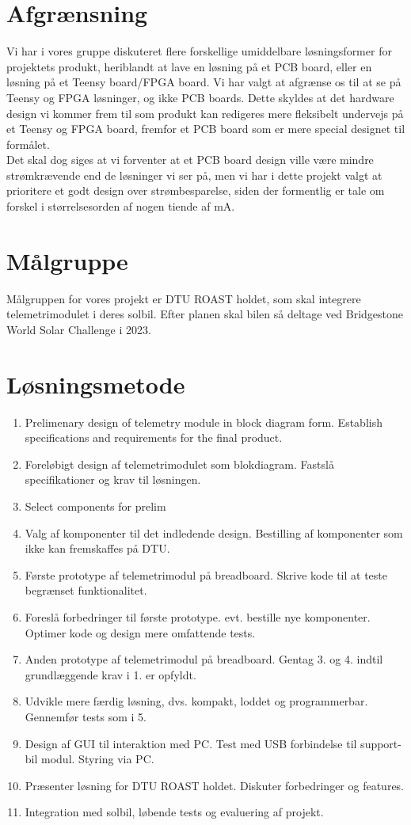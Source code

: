 \documentclass[]{article}
\begin{document}
\section{Afgrænsning}
Vi har i vores gruppe diskuteret flere forskellige umiddelbare løsningsformer for projektets produkt, heriblandt at lave en løsning på et PCB board, eller en løsning på et Teensy board/FPGA board. Vi har valgt at afgrænse os til at se på Teensy og FPGA løsninger, og ikke PCB boards. Dette skyldes at det hardware design vi kommer frem til som produkt kan redigeres mere fleksibelt undervejs på et Teensy og FPGA board, fremfor et PCB board som er mere special designet til formålet.\\
Det skal dog siges at vi forventer at et PCB board design ville være mindre strømkrævende end de løsninger vi ser på, men vi har i dette projekt valgt at prioritere et godt design over strømbesparelse, siden der formentlig er tale om forskel i størrelsesorden af nogen tiende af mA.
\section{Målgruppe}
Målgruppen for vores projekt er DTU ROAST holdet, som skal integrere telemetrimodulet i deres solbil. Efter planen skal bilen så deltage ved Bridgestone World Solar Challenge i 2023.
\section{Løsningsmetode}
\begin{enumerate}
    \item Prelimenary design of telemetry module in block diagram form. Establish specifications and requirements for the final product. 
    \item Foreløbigt design af telemetrimodulet som blokdiagram. Fastslå specifikationer og krav til løsningen. 
    \item Select components for prelim
    \item Valg af komponenter til det indledende design. Bestilling af komponenter som ikke kan fremskaffes på DTU. 
    \item Første prototype af telemetrimodul på breadboard. Skrive kode til at teste begrænset funktionalitet. 
    \item Foreslå forbedringer til første prototype. evt. bestille nye komponenter. Optimer kode og design mere omfattende tests.
    \item Anden prototype af telemetrimodul på breadboard. Gentag 3. og 4. indtil grundlæggende krav i 1. er opfyldt. 
    \item Udvikle mere færdig løsning, dvs. kompakt, loddet og programmerbar. Gennemfør tests som i 5. 
    \item Design af GUI til interaktion med PC. Test med USB forbindelse til support-bil modul. Styring via PC.  
    \item Præsenter løsning for DTU ROAST holdet. Diskuter forbedringer og features. 
    \item Integration med solbil, løbende tests og evaluering af projekt. 
\end{enumerate}
\end{document}
